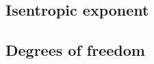 \documentclass[../main.tex]{subfiles}
\begin{document}
    \subsection{Isentropic exponent}
        

    \subsection{Degrees of freedom}
\end{document}
